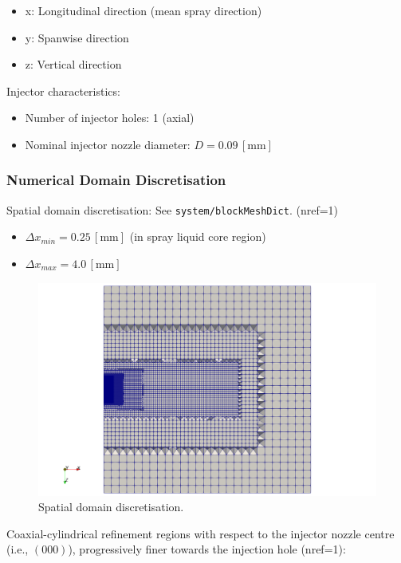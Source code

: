 \begin{itemize}
    \item x: Longitudinal direction (mean spray direction)
    \item y: Spanwise direction
    \item z: Vertical direction
\end{itemize}

Injector characteristics:
\begin{itemize}
    \item Number of injector holes: 1 (axial)
    \item Nominal injector nozzle diameter: $D = 0.09 \, [\mathrm{mm}]$
\end{itemize}

\subsubsection*{Numerical Domain Discretisation}
Spatial domain discretisation: See \texttt{system/blockMeshDict}. (nref=1)

\begin{itemize}
    \item $\Delta x_{min} = 0.25 \, [\mathrm{mm}]$ (in spray liquid core region)
    \item $\Delta x_{max} = 4.0 \, [\mathrm{mm}]$
\end{itemize}

\begin{figure}[H]
    \centering
    \includegraphics[width=\linewidth]{figs/MB18/side-view-mesh.png}
    \caption{Spatial domain discretisation.}
    \label{fig:enter-label}
\end{figure}

Coaxial-cylindrical refinement regions with respect to the injector nozzle centre (i.e., $(0 0 0)$), progressively finer towards the injection hole (nref=1):

